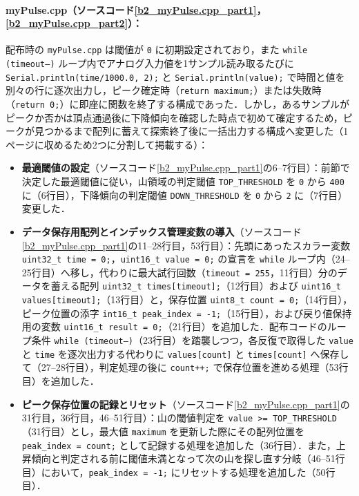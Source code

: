 \paragraph{myPulse.cpp（ソースコード\ref{b2_myPulse.cpp_part1}，\ref{b2_myPulse.cpp_part2}）：}
配布時の \texttt{myPulse.cpp} は閾値が \texttt{0} に初期設定されており，また \texttt{while (timeout--)} ループ内でアナログ入力値を1サンプル読み取るたびに \texttt{Serial.println(time/1000.0, 2);} と \texttt{Serial.println(value);} で時間と値を別々の行に逐次出力し，ピーク確定時（\texttt{return maximum;}）または失敗時（\texttt{return 0;}）に即座に関数を終了する構成であった．しかし，あるサンプルがピークか否かは頂点通過後に下降傾向を確認した時点で初めて確定するため，ピークが見つかるまで配列に蓄えて探索終了後に一括出力する構成へ変更した（1ページに収めるため2つに分割して掲載する）：
\begin{itemize}
  \item \textbf{最適閾値の設定}（ソースコード\ref{b2_myPulse.cpp_part1}の6--7行目）：前節で決定した最適閾値に従い，山領域の判定閾値 \texttt{TOP\_THRESHOLD} を \texttt{0} から \texttt{400} に（6行目），下降傾向の判定閾値 \texttt{DOWN\_THRESHOLD} を \texttt{0} から \texttt{2} に（7行目）変更した．
  \item \textbf{データ保存用配列とインデックス管理変数の導入}（ソースコード\ref{b2_myPulse.cpp_part1}の11--28行目，53行目）：先頭にあったスカラー変数 \texttt{uint32\_t time = 0;}，\texttt{uint16\_t value = 0;} の宣言を \texttt{while} ループ内（24--25行目）へ移し，代わりに最大試行回数（\texttt{timeout = 255}，11行目）分のデータを蓄える配列 \texttt{uint32\_t times[timeout];}（12行目）および \texttt{uint16\_t values[timeout];}（13行目）と，保存位置 \texttt{uint8\_t count = 0;}（14行目），ピーク位置の添字 \texttt{int16\_t peak\_index = -1;}（15行目），および戻り値保持用の変数 \texttt{uint16\_t result = 0;}（21行目）を追加した．配布コードのループ条件 \texttt{while (timeout--)}（23行目）を踏襲しつつ，各反復で取得した \texttt{value} と \texttt{time} を逐次出力する代わりに \texttt{values[count]} と \texttt{times[count]} へ保存して（27--28行目），判定処理の後に \texttt{count++;} で保存位置を進める処理（53行目）を追加した．
  \item \textbf{ピーク保存位置の記録とリセット}（ソースコード\ref{b2_myPulse.cpp_part1}の31行目，36行目，46--51行目）：山の閾値判定を \texttt{value >= TOP\_THRESHOLD}（31行目）とし，最大値 \texttt{maximum} を更新した際にその配列位置を \texttt{peak\_index = count;} として記録する処理を追加した（36行目）．また，上昇傾向と判定される前に閾値未満となって次の山を探し直す分岐（46--51行目）において，\texttt{peak\_index = -1;} にリセットする処理を追加した（50行目）．

\end{itemize}

